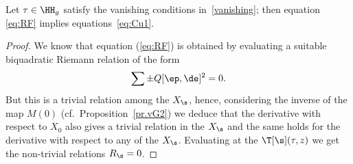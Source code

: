  \begin{Proposition}\label{statement:FG} Let $\tau\in\HH_g$ satisfy the vanishing conditions in~\eqref{vanishing}; then equation \eqref{eq:RF} implies equations~\eqref{eq:Cu1}.
 \end{Proposition}
 \begin{proof}We know that equation (\ref{eq:RF}) is obtained by evaluating a suitable biquadratic Riemann relation of the form
 \[
\sum \pm Q[\ep, \de]^2 =0.
\]
But this is a trivial relation among the $X_{\s}$, hence, considering the inverse of the map $M(0)$ (cf.\ Proposition~\ref{pr.vG2}) we deduce that the derivative with respect to $X_0$ also gives a trivial relation in the $X_{\s}$ and the same holds for the derivative with respect to any of the $X_{\s}$. Evaluating at the $\T[\s](\tau, z)$ we get the non-trivial relations $R_{\s}=0$.
\end{proof}
